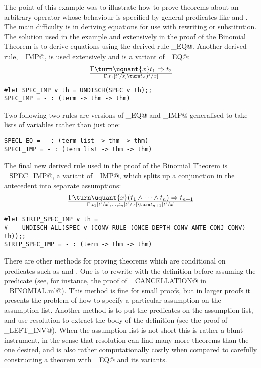 The point of this example was to illustrate how to prove theorems about
an arbitrary operator whose behaviour is specified by general predicates
like \verb@ASSOCIATIVE@ and \verb@COMMUTATIVE@. The main difficulty is
in deriving equations for use with rewriting or substitution.  The solution
used in the example and extensively in the proof of the Binomial Theorem
is to derive equations using the derived rule \verb@SPEC_EQ@. Another derived
rule, \verb@SPEC_IMP@, is used extensively and is a variant of \verb@SPEC_EQ@:
\[
\Gamma\turn \uquant{x} t_1 \Rightarrow t_2
\over
\Gamma, t_1[t'/x] \turn t_2[t'/x]
\]
\begin{session}
\begin{verbatim}
#let SPEC_IMP v th = UNDISCH(SPEC v th);;
SPEC_IMP = - : (term -> thm -> thm)
\end{verbatim}
\end{session}
Two following two rules are versions of \verb@SPEC_EQ@ and \verb@SPEC_IMP@
generalised to take lists of variables rather than just one:
\begin{session}
\begin{verbatim}
SPECL_EQ = - : (term list -> thm -> thm)
SPECL_IMP = - : (term list -> thm -> thm)
\end{verbatim}
\end{session}
The final new derived rule used in the proof of the Binomial Theorem
is \verb@STRIP_SPEC_IMP@, a variant of \verb@SPEC_IMP@, which
splits up a conjunction in the antecedent into separate assumptions:
\[
\Gamma\turn \uquant{x} (t_1 \wedge \cdots \wedge t_n) \Rightarrow t_{n+1}
\over
\Gamma, t_1[t'/x], \ldots, t_n[t'/x] \turn t_{n+1}[t'/x]
\]
\begin{session}
\begin{verbatim}
#let STRIP_SPEC_IMP v th =
#    UNDISCH_ALL(SPEC v (CONV_RULE (ONCE_DEPTH_CONV ANTE_CONJ_CONV) th));;
STRIP_SPEC_IMP = - : (term -> thm -> thm)
\end{verbatim}
\end{session}

There are other methods for proving theorems which are conditional on
predicates such as \verb@ASSOCIATIVE@ and \verb@COMMUTATIVE@.  One is to
rewrite with the definition before assuming the predicate (see, for instance,
the proof of \verb@RIGHT_CANCELLATION@ in \verb@mk_BINOMIAL.ml@). This
method is fine for small proofs, but in larger proofs it presents the problem
of how to specify a particular assumption on the assumption list.  Another
method is to put the predicates on the assumption list, and use resolution
to extract the body of the definition (see the proof of
\verb@UNIQUE_LEFT_INV@).  When the assumption list is not short this is
rather a blunt instrument, in the sense that resolution can find many more
theorems than the one desired, and is also rather computationally costly
when compared to carefully constructing a theorem with \verb@SPEC_EQ@ and
its variants.


